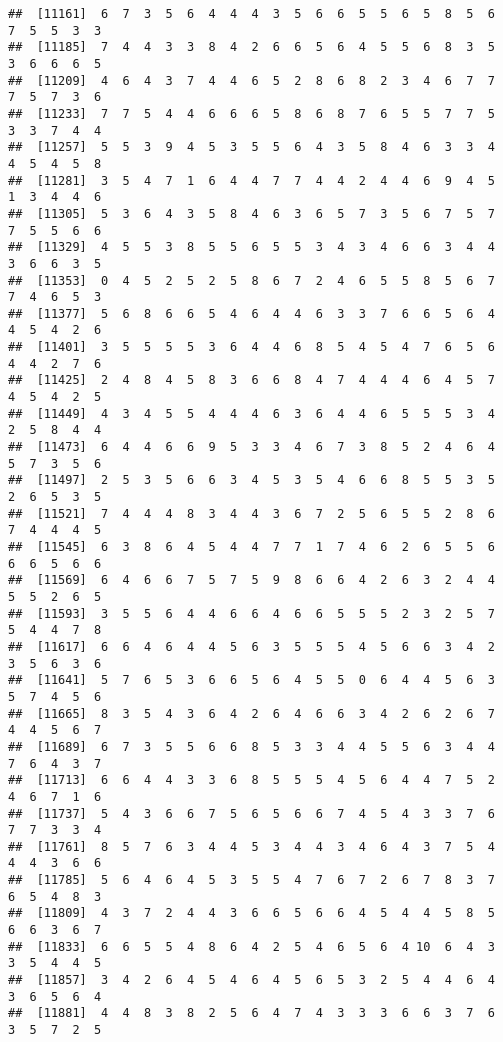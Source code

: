 \documentclass[
]{book}
\begin{document}
\begin{verbatim}
##  [11161]  6  7  3  5  6  4  4  4  3  5  6  6  5  5  6  5  8  5  6  7  5  5  3  3
##  [11185]  7  4  4  3  3  8  4  2  6  6  5  6  4  5  5  6  8  3  5  3  6  6  6  5
##  [11209]  4  6  4  3  7  4  4  6  5  2  8  6  8  2  3  4  6  7  7  7  5  7  3  6
##  [11233]  7  7  5  4  4  6  6  6  5  8  6  8  7  6  5  5  7  7  5  3  3  7  4  4
##  [11257]  5  5  3  9  4  5  3  5  5  6  4  3  5  8  4  6  3  3  4  4  5  4  5  8
##  [11281]  3  5  4  7  1  6  4  4  7  7  4  4  2  4  4  6  9  4  5  1  3  4  4  6
##  [11305]  5  3  6  4  3  5  8  4  6  3  6  5  7  3  5  6  7  5  7  7  5  5  6  6
##  [11329]  4  5  5  3  8  5  5  6  5  5  3  4  3  4  6  6  3  4  4  3  6  6  3  5
##  [11353]  0  4  5  2  5  2  5  8  6  7  2  4  6  5  5  8  5  6  7  7  4  6  5  3
##  [11377]  5  6  8  6  6  5  4  6  4  4  6  3  3  7  6  6  5  6  4  4  5  4  2  6
##  [11401]  3  5  5  5  5  3  6  4  4  6  8  5  4  5  4  7  6  5  6  4  4  2  7  6
##  [11425]  2  4  8  4  5  8  3  6  6  8  4  7  4  4  4  6  4  5  7  4  5  4  2  5
##  [11449]  4  3  4  5  5  4  4  4  6  3  6  4  4  6  5  5  5  3  4  2  5  8  4  4
##  [11473]  6  4  4  6  6  9  5  3  3  4  6  7  3  8  5  2  4  6  4  5  7  3  5  6
##  [11497]  2  5  3  5  6  6  3  4  5  3  5  4  6  6  8  5  5  3  5  2  6  5  3  5
##  [11521]  7  4  4  4  8  3  4  4  3  6  7  2  5  6  5  5  2  8  6  7  4  4  4  5
##  [11545]  6  3  8  6  4  5  4  4  7  7  1  7  4  6  2  6  5  5  6  6  6  5  6  6
##  [11569]  6  4  6  6  7  5  7  5  9  8  6  6  4  2  6  3  2  4  4  5  5  2  6  5
##  [11593]  3  5  5  6  4  4  6  6  4  6  6  5  5  5  2  3  2  5  7  5  4  4  7  8
##  [11617]  6  6  4  6  4  4  5  6  3  5  5  5  4  5  6  6  3  4  2  3  5  6  3  6
##  [11641]  5  7  6  5  3  6  6  5  6  4  5  5  0  6  4  4  5  6  3  5  7  4  5  6
##  [11665]  8  3  5  4  3  6  4  2  6  4  6  6  3  4  2  6  2  6  7  4  4  5  6  7
##  [11689]  6  7  3  5  5  6  6  8  5  3  3  4  4  5  5  6  3  4  4  7  6  4  3  7
##  [11713]  6  6  4  4  3  3  6  8  5  5  5  4  5  6  4  4  7  5  2  4  6  7  1  6
##  [11737]  5  4  3  6  6  7  5  6  5  6  6  7  4  5  4  3  3  7  6  7  7  3  3  4
##  [11761]  8  5  7  6  3  4  4  5  3  4  4  3  4  6  4  3  7  5  4  4  4  3  6  6
##  [11785]  5  6  4  6  4  5  3  5  5  4  7  6  7  2  6  7  8  3  7  6  5  4  8  3
##  [11809]  4  3  7  2  4  4  3  6  6  5  6  6  4  5  4  4  5  8  5  6  6  3  6  7
##  [11833]  6  6  5  5  4  8  6  4  2  5  4  6  5  6  4 10  6  4  3  3  5  4  4  5
##  [11857]  3  4  2  6  4  5  4  6  4  5  6  5  3  2  5  4  4  6  4  3  6  5  6  4
##  [11881]  4  4  8  3  8  2  5  6  4  7  4  3  3  3  6  6  3  7  6  3  5  7  2  5

\end{verbatim}
\end{document}

